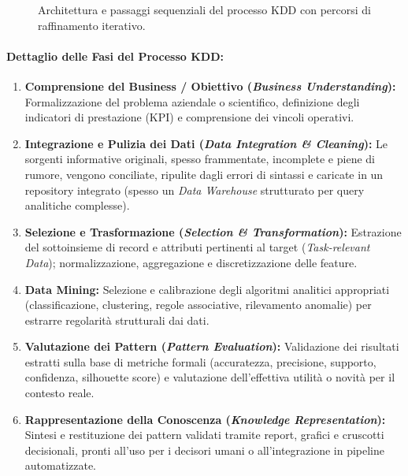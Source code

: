 \begin{figure}[H]
\caption{Architettura e passaggi sequenziali del processo KDD con percorsi di raffinamento iterativo.}
\label{fig:processo-kdd}
\end{figure}

\paragraph{Dettaglio delle Fasi del Processo KDD:}
\begin{enumerate}
    \item \textbf{Comprensione del Business / Obiettivo (\textit{Business Understanding}):} Formalizzazione del problema aziendale o scientifico, definizione degli indicatori di prestazione (KPI) e comprensione dei vincoli operativi.
    \item \textbf{Integrazione e Pulizia dei Dati (\textit{Data Integration \& Cleaning}):} Le sorgenti informative originali, spesso frammentate, incomplete e piene di rumore, vengono conciliate, ripulite dagli errori di sintassi e caricate in un repository integrato (spesso un \textit{Data Warehouse} strutturato per query analitiche complesse).
    \item \textbf{Selezione e Trasformazione (\textit{Selection \& Transformation}):} Estrazione del sottoinsieme di record e attributi pertinenti al target (\textit{Task-relevant Data}); normalizzazione, aggregazione e discretizzazione delle feature.
    \item \textbf{Data Mining:} Selezione e calibrazione degli algoritmi analitici appropriati (classificazione, clustering, regole associative, rilevamento anomalie) per estrarre regolarit\`a strutturali dai dati.
    \item \textbf{Valutazione dei Pattern (\textit{Pattern Evaluation}):} Validazione dei risultati estratti sulla base di metriche formali (accuratezza, precisione, supporto, confidenza, silhouette score) e valutazione dell'effettiva utilit\`a o novit\`a per il contesto reale.
    \item \textbf{Rappresentazione della Conoscenza (\textit{Knowledge Representation}):} Sintesi e restituzione dei pattern validati tramite report, grafici e cruscotti decisionali, pronti all'uso per i decisori umani o all'integrazione in pipeline automatizzate.
\end{enumerate}

